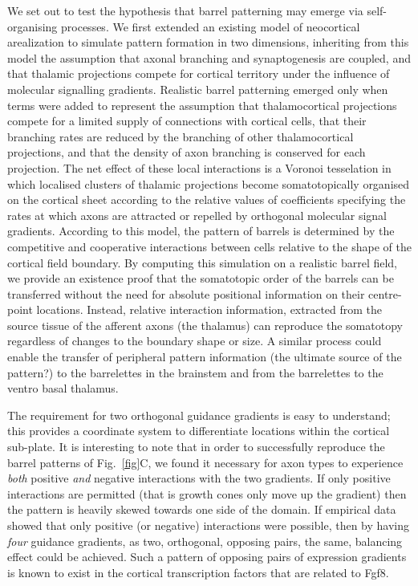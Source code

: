 \documentclass[9pt,twocolumn,twoside,lineno]{pnas-new}
\begin{document}
We set out to test the hypothesis that barrel patterning may emerge via
self-organising processes.
%
We first extended an existing model of neocortical arealization to simulate
pattern formation in two dimensions, inheriting from this model the assumption
that axonal branching and synaptogenesis are coupled, and that thalamic
projections compete for cortical territory under the influence of molecular
signalling gradients.
%
Realistic barrel patterning emerged only when terms were added to represent
the assumption that thalamocortical projections compete for a limited supply
of connections with cortical cells, that their branching rates are reduced by
the branching of other thalamocortical projections, and that the density of
axon branching is conserved for each projection.
%
The net effect of these local interactions is a Voronoi tesselation in which
localised clusters of thalamic projections become somatotopically organised on
the cortical sheet according to the relative values of coefficients specifying
the rates at which axons are attracted or repelled by orthogonal molecular
signal gradients.
%
According to this model, the pattern of barrels is determined by the
competitive and cooperative interactions between cells relative to the shape
of the cortical field boundary. By computing this simulation on a realistic
barrel field, we provide an existence proof that the somatotopic order of the
barrels can be transferred without the need for absolute positional
information on their centre-point locations. Instead, relative interaction
information, extracted from the source tissue of the afferent axons (the
thalamus) can reproduce the somatotopy regardless of changes to the boundary
shape or size. A similar process could enable the transfer of peripheral
pattern information (the ultimate source of the pattern?) to the barrelettes
in the brainstem and from the barrelettes to the ventro basal thalamus.

The requirement for two orthogonal guidance gradients is easy to understand;
this provides a coordinate system to differentiate locations within the
cortical sub-plate. It is interesting to note that in order to successfully
reproduce the barrel patterns of Fig.~\ref{fig}C, we found it necessary for
axon types to experience \emph{both} positive \emph{and} negative interactions
with the two gradients. If only positive interactions are permitted (that is
growth cones only move up the gradient) then the pattern is heavily skewed
towards one side of the domain.
%
If empirical data showed that only positive (or negative) interactions were
possible, then by having \emph{four} guidance gradients, as two, orthogonal,
opposing pairs, the same, balancing effect could be achieved. Such a pattern
of opposing pairs of expression gradients is known to exist in the cortical
transcription factors that are related to Fgf8.
\end{document}
